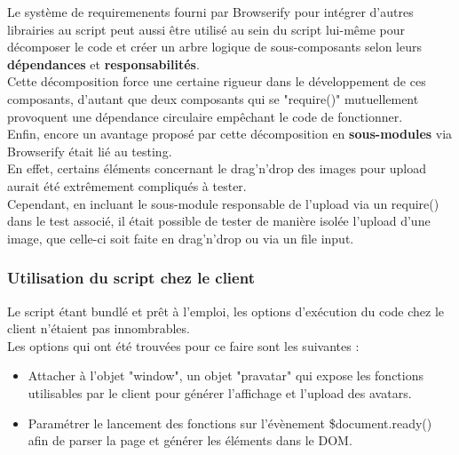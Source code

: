 \documentclass{report}
\begin{document}
          Le système de requiremenents fourni par Browserify pour intégrer d'autres librairies au script peut aussi être utilisé au sein du
          script lui-même pour décomposer le code et créer un arbre logique de sous-composants selon leurs \textbf{dépendances} et \textbf{responsabilités}.\\
          Cette décomposition force une certaine rigueur dans le développement de ces composants, d'autant que deux composants qui se "require()"
          mutuellement provoquent une dépendance circulaire empêchant le code de fonctionner.\\

          Enfin, encore un avantage proposé par cette décomposition en \textbf{sous-modules} via Browserify était lié au testing.\\
          En effet, certains éléments concernant le drag'n'drop des images pour upload aurait été extrêmement compliqués à tester.\\
          Cependant, en incluant le sous-module responsable de l'upload via un require() dans le test associé, il était possible de tester de
          manière isolée l'upload d'une image, que celle-ci soit faite en drag'n'drop ou via un file input.\\

        \subsubsection{Utilisation du script chez le client}
        \label{subs:Utilisation du script chez le client}

          Le script étant bundlé et prêt à l'emploi, les options d'exécution du code chez le client n'étaient pas innombrables.\\

          Les options qui ont été trouvées pour ce faire sont les suivantes :\\

          \begin{itemize}
            \item Attacher à l'objet "window", un objet "pravatar" qui expose les fonctions utilisables par le client pour générer l'affichage et l'upload des avatars.
            \item Paramétrer le lancement des fonctions sur l'évènement \$document.ready() afin de parser la page et générer les éléments dans le DOM.\\
          \end{itemize}
\end{document}
